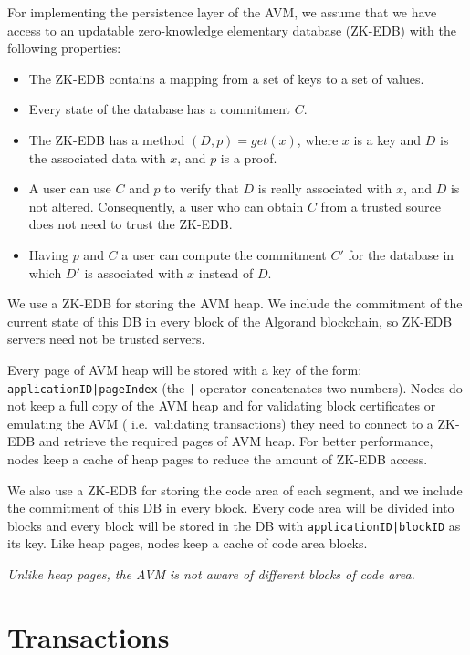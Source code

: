 \documentclass[11pt, A4]{report}
\begin{document}
    For implementing the persistence layer of the AVM, we assume that we have access to an updatable zero-knowledge
    elementary database (ZK-EDB) with the following properties:

    \begin{itemize}
        \item The ZK-EDB contains a mapping from a set of keys to a set of values.
        \item Every state of the database has a commitment \(C\).
        \item The ZK-EDB has a method \((D, p) = get(x)\), where \(x\) is a key and \(D\) is the associated data
        with \(x\), and \(p\) is a proof.
        \item A user can use \(C\) and \(p\) to verify that \(D\) is really associated with \(x\), and \(D\) is not
        altered. Consequently, a user who can obtain \(C\) from a trusted source does not need to trust the ZK-EDB.
        \item Having \(p\) and \(C\) a user can compute the commitment \(C'\) for the database in which \(D'\) is
        associated with \(x\) instead of \(D\).
    \end{itemize}

    We use a ZK-EDB for storing the AVM heap. We include the commitment of the current state of this DB in every
    block of the Algorand blockchain, so ZK-EDB servers need not be trusted servers.

    Every page of AVM heap will be stored with a key of the form: \texttt{applicationID|pageIndex} (the \texttt{|}
    operator concatenates two numbers). Nodes do not keep a full copy of the AVM heap and for validating block
    certificates or emulating the AVM ( i.e.~validating transactions) they need to connect to a ZK-EDB and retrieve
    the required pages of AVM heap. For better performance, nodes keep a cache of heap pages to
    reduce the amount of ZK-EDB access.

    We also use a ZK-EDB for storing the code area of each segment, and we include the commitment of this DB in every
    block. Every code area will be divided into blocks and every block will be stored in the DB with
    \texttt{applicationID|blockID} as its key. Like heap pages, nodes keep a cache of code area blocks.

    \emph{Unlike heap pages, the AVM is not aware of different blocks of code area.}


    \section{Transactions}\label{sec:transactions}
\end{document}
